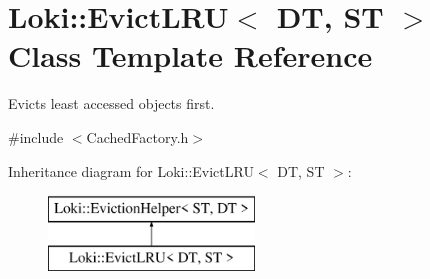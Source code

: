\hypertarget{classLoki_1_1EvictLRU}{}\section{Loki\+:\+:Evict\+L\+R\+U$<$ D\+T, S\+T $>$ Class Template Reference}
\label{classLoki_1_1EvictLRU}


Evicts least accessed objects first.  




{\ttfamily \#include $<$Cached\+Factory.\+h$>$}

Inheritance diagram for Loki\+:\+:Evict\+L\+R\+U$<$ D\+T, S\+T $>$\+:\begin{figure}[H]
\begin{center}
\leavevmode
\includegraphics[height=2.000000cm]{classLoki_1_1EvictLRU}
\end{center}
\end{figure}
